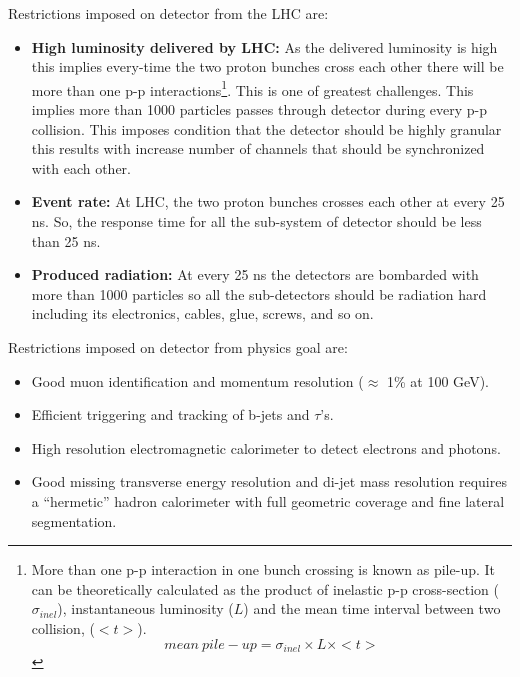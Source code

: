 Restrictions imposed on detector from the LHC are:

\begin{itemize}
	\item \textbf{High luminosity delivered by LHC:} As the delivered luminosity is high this implies every-time the two proton bunches cross each other there will be more than one p-p interactions\footnote{More than one p-p interaction in one bunch crossing is known as pile-up. It can be theoretically calculated as the product of inelastic p-p cross-section ($\sigma_{inel}$), instantaneous luminosity ($L$) and the mean time interval between two collision, ($< t >$). \begin{equation}
		mean~pile-up = \sigma_{inel} \times L \times <t>
	\end{equation}}. This is one of greatest challenges. This implies more than 1000 particles passes through detector during every p-p collision. This imposes condition that the detector should be highly granular this results with increase number of channels that should be synchronized with each other.
	\item \textbf{Event rate:} At LHC, the two proton bunches crosses each other at every 25 ns. So, the response time for all the sub-system of detector should be less than 25 ns.
	\item \textbf{Produced radiation:} At every 25 ns the detectors are bombarded with more than 1000 particles so all the sub-detectors should be radiation hard including its electronics, cables, glue, screws, and so on.
\end{itemize}

Restrictions imposed on detector from physics goal are:

\begin{itemize}
	\item Good muon identification and momentum resolution ($\approx$ 1\% at 100 GeV).
	\item Efficient triggering and tracking of b-jets and $\tau$'s.
	\item High resolution electromagnetic calorimeter to detect electrons and photons.
	\item Good missing transverse energy resolution and di-jet mass resolution requires a ``hermetic'' hadron calorimeter with full geometric coverage and fine lateral segmentation.
\end{itemize}


